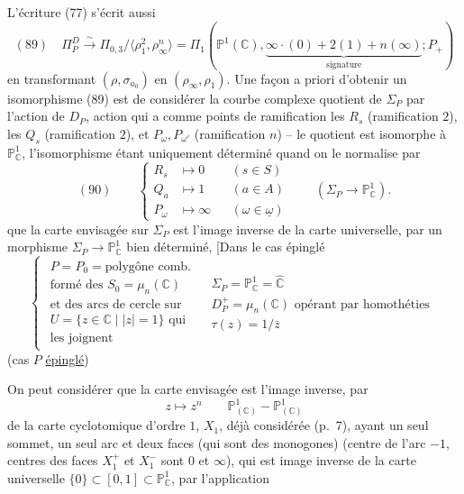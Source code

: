 L'écriture (77) s'écrit aussi
\[
(89)\quad
\Pi_P^D\xrightarrow{\sim}
\Pi_{0,3}/\langle\rho_1^2,\rho_\infty^n\rangle
=\Pi_1(\mathbb P^1(\mathbb C),
\underbrace{\infty\cdot(0)+2(1)+n(\infty)}_{\text{signature}};P_+)
\]
en transformant $(\rho,\sigma_{a_0})$ en $(\rho_\infty,\rho_1)$.
Une façon a priori d'obtenir un isomorphisme (89) est de considérer la courbe complexe quotient de $\Sigma_P$ par l'action de $D_P$,  action  qui a comme points de ramification les $R_s$ (ramification $2$), les $Q_s$ (ramification $2$), et $P_\omega,P_{\omega'}$ (ramification $n$) -- le quotient est  isomorphe à $\mathbb P^1_{\mathbb C}$, l'isomorphisme étant uniquement déterminé quand on le normalise par
\[
(90)\qquad
\left\{
\begin{aligned}
R_s&\longmapsto0&&(s\in S)\\
Q_a&\longmapsto1&&(a\in A)\\
P_\omega&\longmapsto\infty&&(\omega\in\underline\omega)
\end{aligned}
\right.
\qquad(\Sigma_P\longrightarrow\mathbb P^1_{\mathbb C}).
\]
 que la carte envisagée sur $\Sigma_P$ est l'image inverse de la carte universelle, par un morphisme $\Sigma_P\to\mathbb P^1_{\mathbb C}$ bien déterminé,  [Dans le cas épinglé
\[
\tag{91}
\left\{
\begin{array}{ll}
\begin{gathered}
P=P_0=\text{polygône comb.}\\
\text{formé des }S_0=\mu_n(\mathbb C)\\
\text{et des arcs de cercle sur}\\
U=\{z\in\mathbb C\mid |z|=1\}\text{ qui}\\
\text{les joignent}
\end{gathered}
&
\begin{gathered}
\Sigma_P=\mathbb P^1_{\mathbb C}=\widehat{\mathbb C}\\
D_P^+=\mu_n(\mathbb C)\text{ opérant par homothéties}\\
\tau(z)=1/\bar z
\end{gathered}
\end{array}
\right.
\]
(cas $P$ \uline{épinglé})

On peut considérer que la carte envisagée  est l'image inverse, par
\[
z\longmapsto z^n
\qquad \mathbb P^1_{(\mathbb C)}\mathbin{-}\mathbb P^1_{(\mathbb C)}
\]
de la carte cyclotomique d'ordre $1$, $X_1$, déjà considérée (p.~7), ayant un seul sommet, un seul arc et deux faces (qui sont des monogones) (centre de l'arc $-1$, centres des faces $X_1^+$ et $X_1^-$ sont $0$ et $\infty$), qui est image inverse de la carte universelle  $\{0\}\subset[0,1]\subset\mathbb P^1_{\mathbb C}$, par l'application

